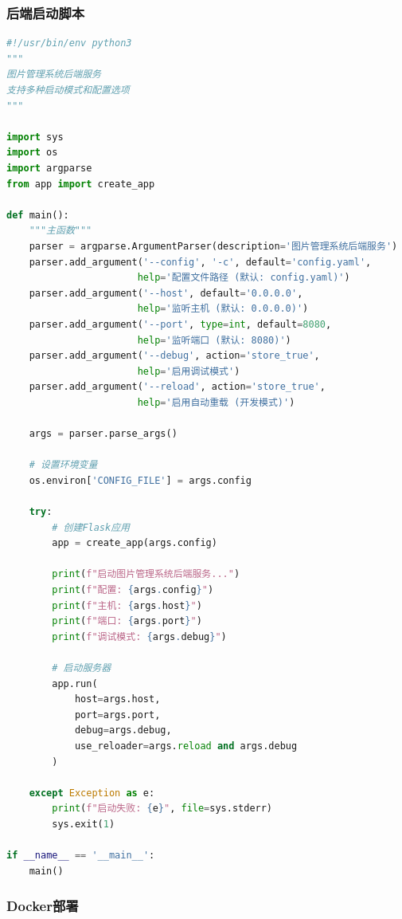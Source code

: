 \documentclass[cs4size,a4paper]{ctexart}
\numberwithin{equation}{section}
\numberwithin{table}{section}
\numberwithin{figure}{section}
\begin{document}
\subsubsection{后端启动脚本}

\begin{lstlisting}[language=Python,caption=后端启动脚本]
#!/usr/bin/env python3
"""
图片管理系统后端服务
支持多种启动模式和配置选项
"""

import sys
import os
import argparse
from app import create_app

def main():
    """主函数"""
    parser = argparse.ArgumentParser(description='图片管理系统后端服务')
    parser.add_argument('--config', '-c', default='config.yaml',
                       help='配置文件路径 (默认: config.yaml)')
    parser.add_argument('--host', default='0.0.0.0',
                       help='监听主机 (默认: 0.0.0.0)')
    parser.add_argument('--port', type=int, default=8080,
                       help='监听端口 (默认: 8080)')
    parser.add_argument('--debug', action='store_true',
                       help='启用调试模式')
    parser.add_argument('--reload', action='store_true',
                       help='启用自动重载 (开发模式)')

    args = parser.parse_args()

    # 设置环境变量
    os.environ['CONFIG_FILE'] = args.config

    try:
        # 创建Flask应用
        app = create_app(args.config)

        print(f"启动图片管理系统后端服务...")
        print(f"配置: {args.config}")
        print(f"主机: {args.host}")
        print(f"端口: {args.port}")
        print(f"调试模式: {args.debug}")

        # 启动服务器
        app.run(
            host=args.host,
            port=args.port,
            debug=args.debug,
            use_reloader=args.reload and args.debug
        )

    except Exception as e:
        print(f"启动失败: {e}", file=sys.stderr)
        sys.exit(1)

if __name__ == '__main__':
    main()
\end{lstlisting}

\subsubsection{Docker部署}
\end{document}
